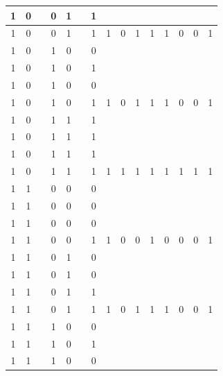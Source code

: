 \begin{table}[!tb]
\begin{tabular}{|c|c|c|c|c|c|c|c|c|c|c|c|c|c|c|}
        \rowcolor{yellow!40} 1 & 0 &  & 0 & 1 &  & 1 &  &  &  &  &  &  &  &  \\ \hline
        \rowcolor{yellow!40} 1 & 0 &  & 0 & 1 &  & 1 & 1 & 0 & 1 & 1 & 1 & 0 & 0 & 1 \\ \hline
        \rowcolor{gray!40} 1 & 0 &  & 1 & 0 &  & 0 &  &  &  &  &  &  &  &  \\ \hline
        \rowcolor{gray!40} 1 & 0 &  & 1 & 0 &  & 1 &  &  &  &  &  &  &  &  \\ \hline
        \rowcolor{gray!40} 1 & 0 &  & 1 & 0 &  & 0 &  &  &  &  &  &  &  &  \\ \hline
        \rowcolor{gray!40} 1 & 0 &  & 1 & 0 &  & 1 & 1 & 0 & 1 & 1 & 1 & 0 & 0 & 1 \\ \hline
        \rowcolor{blue!40} 1 & 0 &  & 1 & 1 &  & 1 &  &  &  &  &  &  &  &  \\ \hline
        \rowcolor{blue!40} 1 & 0 &  & 1 & 1 &  & 1 &  &  &  &  &  &  &  &  \\ \hline
        \rowcolor{blue!40} 1 & 0 &  & 1 & 1 &  & 1 &  &  &  &  &  &  &  &  \\ \hline
        \rowcolor{blue!40} 1 & 0 &  & 1 & 1 &  & 1 & 1 & 1 & 1 & 1 & 1 & 1 & 1 & 1 \\ \hline
        \rowcolor{red!40} 1 & 1 &  & 0 & 0 &  & 0 &  &  &  &  &  &  &  &  \\ \hline
        \rowcolor{red!40} 1 & 1 &  & 0 & 0 &  & 0 &  &  &  &  &  &  &  &  \\ \hline
        \rowcolor{red!40} 1 & 1 &  & 0 & 0 &  & 0 &  &  &  &  &  &  &  &  \\ \hline
        \rowcolor{red!40} 1 & 1 &  & 0 & 0 &  & 1 & 1 & 0 & 0 & 1 & 0 & 0 & 0 & 1 \\ \hline
        \rowcolor{green!40} 1 & 1 &  & 0 & 1 &  & 0 &  &  &  &  &  &  &  &  \\ \hline
        \rowcolor{green!40} 1 & 1 &  & 0 & 1 &  & 0 &  &  &  &  &  &  &  &  \\ \hline
        \rowcolor{green!40} 1 & 1 &  & 0 & 1 &  & 1 &  &  &  &  &  &  &  &  \\ \hline
        \rowcolor{green!40} 1 & 1 &  & 0 & 1 &  & 1 & 1 & 0 & 1 & 1 & 1 & 0 & 0 & 1 \\ \hline
        \rowcolor{yellow!40} 1 & 1 &  & 1 & 0 &  & 0 &  &  &  &  &  &  &  &  \\ \hline
        \rowcolor{yellow!40} 1 & 1 &  & 1 & 0 &  & 1 &  &  &  &  &  &  &  &  \\ \hline
        \rowcolor{yellow!40} 1 & 1 &  & 1 & 0 &  & 0 &  &  &  &  &  &  &  &  \\ \hline

\end{tabular}
\end{table}
